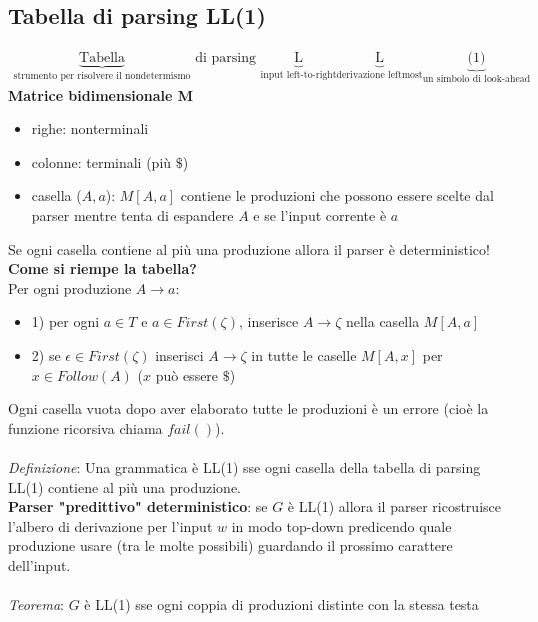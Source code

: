 \documentclass[a4paper,12pt]{article}
\begin{document}
{\subsection{Tabella di parsing LL(1)}
\begin{align*}
  \underbrace{\text{Tabella}}_\text{strumento per risolvere il nondetermismo} \text{ di parsing } \underbrace{\text{L}}_\text{input left-to-right} \underbrace{\text{L}}_\text{derivazione leftmost} \underbrace{\text{(1)}}_\text{un simbolo di look-ahead}
\end{align*}
\textbf{Matrice bidimensionale M}
\begin{itemize}
  \item righe: nonterminali
  \item colonne: terminali (più $\mathdollar$)
  \item casella ($A, a$): $M[A,a]$ contiene le produzioni che possono essere scelte dal parser mentre tenta di espandere $A$ e se l'input corrente è $a$
\end{itemize}
Se ogni casella contiene al più una produzione allora il parser è deterministico! \\
\textbf{Come si riempe la tabella?} \\
Per ogni produzione $A \to a$:
\begin{itemize}
  \item 1) per ogni $a \in T$ e $a \in First(\zeta)$, inserisce $A \to \zeta$ nella casella $M[A,a]$
  \item 2) se $\epsilon \in First(\zeta)$ inserisci $A \to \zeta$ in tutte le caselle $M[A,x]$ per $x \in Follow(A)$ ($x$ può essere $\mathdollar$)
\end{itemize}
Ogni casella vuota dopo aver elaborato tutte le produzioni è un errore (cioè la funzione ricorsiva chiama $fail()$). \\
\vspace{1em} \\
\textit{Definizione}: Una grammatica è LL(1) sse ogni casella della tabella di parsing LL(1) contiene al più una produzione. \\
\textbf{Parser "predittivo" deterministico}: se $G$ è LL(1) allora il parser ricostruisce l'albero di derivazione per l'input $w$ in modo top-down predicendo quale produzione usare (tra le molte possibili) guardando il prossimo carattere dell'input. \\
\vspace{1em} \\
\textit{Teorema}: $G$ è LL(1) sse ogni coppia di produzioni distinte con la stessa testa
}
\end{document}
